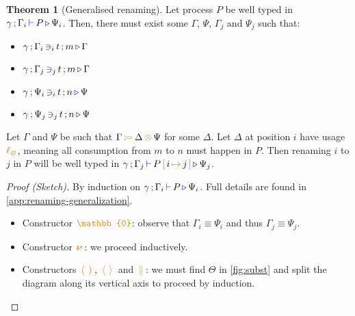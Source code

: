 \documentclass[sigplan,10pt,anonymous,review]{acmart}
\theoremstyle{definition}
\newtheorem{nitheorem}{Theorem}
\newcommand{\type}[1]{\textcolor{blue}{\operatorname{#1}}}
\newcommand{\constr}[1]{\textcolor{orange}{\operatorname{#1}}}
\newcommand{\func}[1]{\textcolor{olive}{\operatorname{#1}}}
\newcommand{\PO}{\constr{\mathbb{0}}}
\newcommand{\comp}[2]{#1 \, \constr{\parallel} \, #2}
\newcommand{\new}{\constr{\boldsymbol{\nu}} \,}
\newcommand{\send}[2]{#1 \, \constr{\langle} \, #2 \,\constr{\rangle} \,}
\newcommand{\recv}[2]{#1 \, \constr{\mathbb{(}} \, #2 \, \constr{\mathbb{)}} \,}
\newcommand{\subst}[3]{#1 \, \func{[} \, #3 \, \func{\mapsto} \,#2 \, \func{]}}
\newcommand{\opctx}[3]{#1 \, \func{\coloneqq} \, #2 \, \func{\otimes} \, #3}
\newcommand{\lz}{\func{\ell_{\varnothing}}}
\newcommand{\types}[4]{#1 \, \type{;} \, #2 \, \type{\vdash} \, #3 \, \type{\triangleright} \, #4}
\newcommand{\contains}[6]{#1 \, \type{;} \, #2 \, \type{\ni}_{#3} \, #4 \, \type{;} \, #5 \, \type{\triangleright} \, #6}
\begin{document}
\begin{nitheorem}[Generalised renaming]
  \label{thm:renaming-generalization}
  Let process $P$ be well typed in $\types{\gamma}{\Gamma_i}{P}{\Psi_i}$.
  Then, there must exist some $\Gamma$, $\Psi$, $\Gamma_j$ and $\Psi_j$ such that:
  \begin{multicols}{2}
  \begin{itemize}
    \item $\contains{\gamma}{\Gamma_i}{i}{t}{m}{\Gamma}$
    \item $\contains{\gamma}{\Gamma_j}{j}{t}{m}{\Gamma}$
    \item $\contains{\gamma}{\Psi_i}{i}{t}{n}{\Psi}$
    \item $\contains{\gamma}{\Psi_j}{j}{t}{n}{\Psi}$
  \end{itemize}
  \end{multicols}
  Let $\Gamma$ and $\Psi$ be such that $\opctx{\Gamma}{\Delta}{\Psi}$ for some $\Delta$.
  Let $\Delta$ at position $i$ have usage $\lz$, meaning all consumption from $m$ to $n$ must happen in $P$.
  Then renaming $i$ to $j$ in $P$ will be well typed in $\types{\gamma}{\Gamma_j}{\subst{P}{j}{i}}{\Psi_j}$.
\end{nitheorem}

\begin{proof}[Proof (Sketch)]
  By induction on $\types{\gamma}{\Gamma_i}{P}{\Psi_i}$.
  Full details are found in \autoref{app:renaming-generalization}.
  \begin{itemize}
   \item
     Constructor $\PO$: observe that $\Gamma_i \equiv \Psi_i$ and thus $\Gamma_j \equiv \Psi_j$.
   \item
     Constructor $\new$: we proceed inductively.
   \item
     Constructors $\recv{}{}$, $\send{}{}$ and $\comp{}{}$: we must find $\Theta$ in \autoref{fig:subst} and split the diagram along its vertical axis to proceed by induction. \qedhere
 \end{itemize}
\end{proof}
\end{document}

